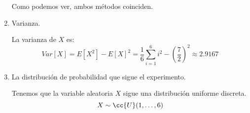\begin{ejercicio}
\begin{enumerate}
        Como podemos ver, ambos métodos coinciden.

        \item Varianza.
        
        La varianza de $X$ es:
        \begin{equation*}
            Var[X] = E[X^2] - E[X]^2 = \dfrac{1}{6} \sum_{i=1}^{6}i^2 - \left(\dfrac{7}{2}\right)^2 \approx 2.9167
        \end{equation*}

        \item La distribución de probabilidad que sigue el experimento.
        
        Tenemos que la variable aleatoria $X$ sigue una distribución uniforme discreta.
        \begin{equation*}
            X\sim \cc{U}(1,\dots,6)
        \end{equation*}
    \end{enumerate}
\end{ejercicio} 


